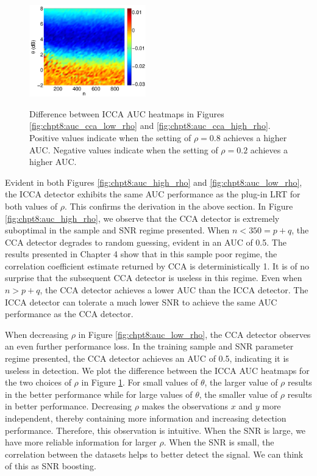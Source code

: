 \begin{figure} 
  \centering\includegraphics[width=0.45\textwidth]{chpt8_det_reg/figures/auc_icca_diff.pdf}
  \label{fig:chpt8:auc_cca_diff}
  \caption{Difference between ICCA AUC heatmaps in Figures \ref{fig:chpt8:auc_cca_low_rho}
  and \ref{fig:chpt8:auc_cca_high_rho}. Positive values indicate when the setting of
  $\rho=0.8$ achieves a higher AUC. Negative values indicate when the setting of
  $\rho=0.2$ achieves a higher AUC.}
  \label{fig:chpt8:auc_diff}
\end{figure}


Evident in both Figures \ref{fig:chpt8:auc_high_rho} and \ref{fig:chpt8:auc_low_rho}, the ICCA
detector exhibits the same AUC performance as the plug-in LRT for both values of
$\rho$. This confirms the derivation in the above section. In Figure
\ref{fig:chpt8:auc_high_rho}, we observe that the CCA detector is extremely suboptimal in the
sample and SNR regime presented. When $n<350=p+q$, the CCA detector degrades to random
guessing, evident in an AUC of 0.5. The results presented in Chapter
4 show that in this sample poor regime, the correlation coefficient
estimate returned by CCA is deterministically 1. It is of no surprise that the subsequent
CCA detector is useless in this regime. Even when $n>p+q$, the CCA detector achieves a
lower AUC than the ICCA detector. The ICCA detector can tolerate a much lower SNR to achieve
the same AUC performance as the CCA detector.

When decreasing $\rho$ in Figure \ref{fig:chpt8:auc_low_rho}, the CCA detector observes an even
further performance loss. In the training sample and SNR parameter regime presented,
the CCA detector achieves an AUC of 0.5, indicating it is useless in detection. We plot
the difference between the ICCA AUC heatmaps for the two choices of $\rho$ in Figure
\ref{fig:chpt8:auc_diff}. For small values of $\theta$, the larger value of $\rho$ results in
the better performance while for large values of $\theta$, the smaller value of $\rho$ results
in better performance. Decreasing $\rho$ makes the observations $x$ and $y$ more
independent, thereby containing more information and increasing detection
performance. Therefore, this observation is intuitive. When the SNR is large, we have more
reliable information for larger $\rho$. When the SNR is small, the correlation between the
datasets helps to better detect the signal. We can think of this as SNR boosting.

